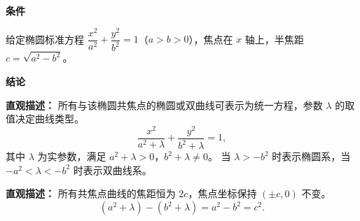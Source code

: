 \begin{statementbox}

	\textbf{\textcolor{CStatement}{条件}}
	\begin{description}[style=nextline, leftmargin=2.8em, labelsep=0.5em, itemsep=0.35em]
		\item[\textbf{\textcolor{CStatement}{条件 1（基准椭圆）：}}]
			给定椭圆标准方程 $\dfrac{x^2}{a^2}+\dfrac{y^2}{b^2}=1$（$a>b>0$），焦点在 $x$ 轴上，半焦距 $c=\sqrt{a^2-b^2}$。
	\end{description}

	\textbf{\textcolor{CStatement}{结论}}
	\begin{description}[style=nextline, leftmargin=2.8em, labelsep=0.5em, itemsep=0.45em]
		\item[\textbf{\textcolor{CStatement}{结论一（统一方程）：}}]
			\textbf{\textcolor{CStatement}{直观描述：}}
			所有与该椭圆共焦点的椭圆或双曲线可表示为统一方程，参数 $\lambda$ 的取值决定曲线类型。
			\[
				\boxed{\frac{x^2}{a^2+\lambda}+\frac{y^2}{b^2+\lambda}=1},
			\]
			其中 $\lambda$ 为实参数，满足 $a^2+\lambda>0$，$b^2+\lambda\neq 0$。
			当 $\lambda>-b^2$ 时表示椭圆系，当 $-a^2<\lambda<-b^2$ 时表示双曲线系。

		\item[\textbf{\textcolor{CStatement}{推广结论（焦点不变）：}}]
			\textbf{\textcolor{CStatement}{直观描述：}}
			所有共焦点曲线的焦距恒为 $2c$，焦点坐标保持 $(\pm c,0)$ 不变。
			\[
				(a^2+\lambda)-(b^2+\lambda)=a^2-b^2=c^2.
			\]
	\end{description}

\end{statementbox}

